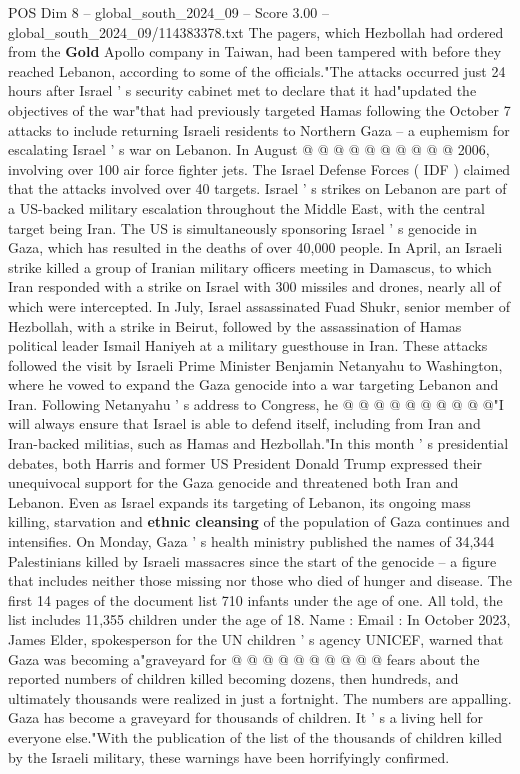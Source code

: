 \begin{textsample}{POS Dim 8 – global\_south\_2024\_09 – Score 3.00 – global\_south\_2024\_09/114383378.txt}
The pagers, which Hezbollah had ordered from the \textbf{Gold} Apollo company in Taiwan, had been tampered with before they reached Lebanon, according to some of the officials."The attacks occurred just 24 hours after Israel ' s security cabinet met to declare that it had"updated the objectives of the war"that had previously targeted Hamas following the October 7 attacks to include returning Israeli residents to Northern Gaza -- a euphemism for escalating Israel ' s war on Lebanon.
In August @ @ @ @ @ @ @ @ @ @ 2006, involving over 100 air force fighter jets.
The Israel Defense Forces ( IDF ) claimed that the attacks involved over 40 targets.
Israel ' s strikes on Lebanon are part of a US-backed military escalation throughout the Middle East, with the central target being Iran.
The US is simultaneously sponsoring Israel ' s genocide in Gaza, which has resulted in the deaths of over 40,000 people.
In April, an Israeli strike killed a group of Iranian military officers meeting in Damascus, to which Iran responded with a strike on Israel with 300 missiles and drones, nearly all of which were intercepted.
In July, Israel assassinated Fuad Shukr, senior member of Hezbollah, with a strike in Beirut, followed by the assassination of Hamas political leader Ismail Haniyeh at a military guesthouse in Iran.
These attacks followed the visit by Israeli Prime Minister Benjamin Netanyahu to Washington, where he vowed to expand the Gaza genocide into a war targeting Lebanon and Iran.
Following Netanyahu ' s address to Congress, he @ @ @ @ @ @ @ @ @ @"I will always ensure that Israel is able to defend itself, including from Iran and Iran-backed militias, such as Hamas and Hezbollah."In this month ' s presidential debates, both Harris and former US President Donald Trump expressed their unequivocal support for the Gaza genocide and threatened both Iran and Lebanon.
Even as Israel expands its targeting of Lebanon, its ongoing mass killing, starvation and \textbf{ethnic} \textbf{cleansing} of the population of Gaza continues and intensifies.
On Monday, Gaza ' s health ministry published the names of 34,344 Palestinians killed by Israeli massacres since the start of the genocide -- a figure that includes neither those missing nor those who died of hunger and disease.
The first 14 pages of the document list 710 infants under the age of one.
All told, the list includes 11,355 children under the age of 18.
Name : Email : In October 2023, James Elder, spokesperson for the UN children ' s agency UNICEF, warned that Gaza was becoming a"graveyard for @ @ @ @ @ @ @ @ @ @ fears about the reported numbers of children killed becoming dozens, then hundreds, and ultimately thousands were realized in just a fortnight.
The numbers are appalling.
Gaza has become a graveyard for thousands of children.
It ' s a living hell for everyone else."With the publication of the list of the thousands of children killed by the Israeli military, these warnings have been horrifyingly confirmed.

\end{textsample}
